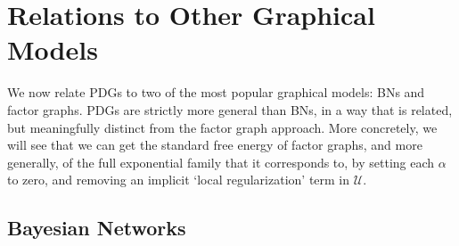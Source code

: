 \documentclass{article}
\numberwithin{equation}{section}
\begin{document}


	\section{Relations to Other Graphical Models}\label{sec:other-graphical-models}
	We now relate PDGs to two of the most popular graphical models: BNs and factor graphs. PDGs are strictly more general than BNs, in a way that is related, but meaningfully distinct from the factor graph approach. More concretely, we will see that we can get the standard free energy of factor graphs, and more generally, of the full exponential family that it corresponds to, by setting each $\alpha$ to zero, and removing an implicit  `local regularization' term in $\mathcal U$.
		
	\subsection{Bayesian Networks} \label{sec:bn-convert}
		
\end{document}
